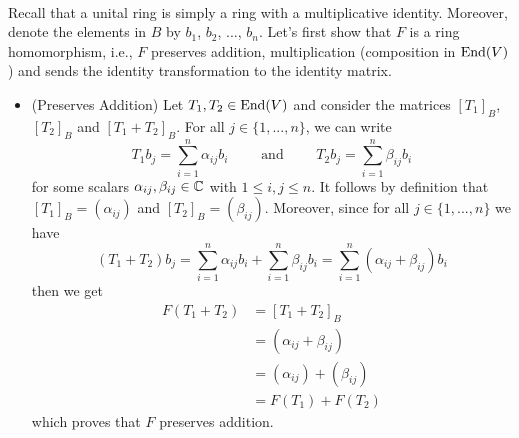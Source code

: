 \begin{solution}
    \\ Recall that a unital ring is simply a ring with a multiplicative identity. Moreover, denote the elements in $B$ by $b_1$, $b_2$, ..., $b_n$. Let's first show that $F$ is a ring homomorphism, i.e., $F$ preserves addition, multiplication (composition in $\text{End}(V)$) and sends the identity transformation to the identity matrix. 
    \begin{itemize}
        \item (Preserves Addition) Let $T_1, T_2 \in \text{End}(V)$ and consider the matrices $[T_1]_B$, $[T_2]_B$ and $[T_1 + T_2]_B$. For all $j \in \{1, ..., n\}$, we can write
        $$T_1b_j = \sum_{i=1}^{n}\alpha_{ij}b_i \qquad \text{ and } \qquad T_2b_j = \sum_{i=1}^{n}\beta_{ij}b_i$$
        for some scalars $\alpha_{ij}, \beta_{ij} \in \mathbb{C}$ with $1\leq i,j \leq n$. It follows by definition that $[T_1]_B = (\alpha_{ij})$ and $[T_2]_B = (\beta_{ij})$. Moreover, since for all $j \in \{1, ..., n\}$ we have
        $$(T_1 + T_2)b_j = \sum_{i=1}^{n}\alpha_{ij}b_i + \sum_{i=1}^{n}\beta_{ij}b_i = \sum_{i=1}^{n}(\alpha_{ij} + \beta_{ij})b_i$$
        then we get
        \begin{align*}
            F(T_1 + T_2) &= [T_1 + T_2]_B \\
            &= (\alpha_{ij} + \beta_{ij}) \\
            &= (\alpha_{ij}) + (\beta_{ij}) \\
            &= F(T_1) + F(T_2)
        \end{align*}
        which proves that $F$ preserves addition.


\end{itemize}
\end{solution}
